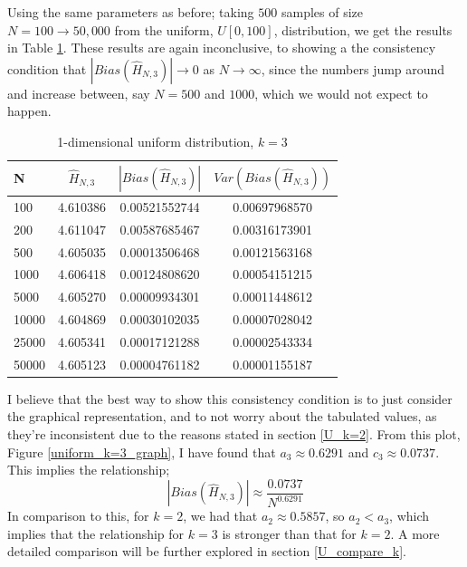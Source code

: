 \documentclass{article}
\begin{document}
Using the same parameters as before; taking $500$ samples of size $N=100 \to 50,000$ from the uniform, $U[0, 100]$, distribution, we get the results in Table \ref{uniform_k=3_table}. These results are again inconclusive, to showing a the consistency condition that $|Bias(\hat{H}_{N, 3})| \to 0$ as $N \to \infty$, since the numbers jump around and increase between, say $N=500$ and $1000$, which we would not expect to happen.

\begin{table}
\caption{1-dimensional uniform distribution, $k=3$} \label{uniform_k=3_table}
\begin{center}
\begin{tabular}{| l | c c c|} 
\toprule
N & $\hat{H}_{N, 3}$ & $|Bias(\hat{H}_{N, 3})|$ & $Var(Bias(\hat{H}_{N, 3}))$ \\
\midrule[1pt]
100     & 4.610386     & 0.00521552744     & 0.00697968570  \\
200     & 4.611047     & 0.00587685467     & 0.00316173901  \\
500     & 4.605035     & 0.00013506468     & 0.00121563168  \\
1000    & 4.606418     & 0.00124808620     & 0.00054151215  \\
5000    & 4.605270     & 0.00009934301     & 0.00011448612  \\
10000   & 4.604869     & 0.00030102035     & 0.00007028042  \\
25000   & 4.605341     & 0.00017121288     & 0.00002543334  \\
50000   & 4.605123     & 0.00004761182     & 0.00001155187  \\
\hline
\end{tabular}
\end{center}
\end{table}

I believe that the best way to show this consistency condition is to just consider the graphical representation, and to not worry about the tabulated values, as they're inconsistent due to the reasons stated in section \ref{U_k=2}. From this plot, Figure \ref{uniform_k=3_graph}, I have found that $a_{3} \approx 0.6291$ and $c_{3} \approx 0.0737$. This implies the relationship;
\begin{equation}
|Bias(\hat{H}_{N, 3})| \approx \frac{0.0737}{N^{0.6291}}\nonumber
\end{equation}
In comparison to this, for $k=2$, we had that $a_{2} \approx 0.5857$, so $a_{2} < a_{3}$, which implies that the relationship for $k=3$ is stronger than that for $k=2$. A more detailed comparison will be further explored in section \ref{U_compare_k}.
\end{document}
